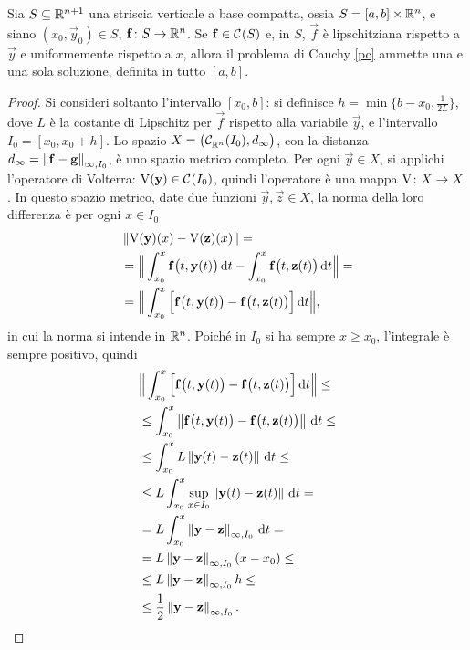 \begin{teorema} \label{t:E-globale}
	Sia $S\subseteq\mathbb{R}^{n+1}$ una striscia verticale a base compatta, ossia $S=[a,b]\times\mathbb{R}^n$, e siano $(x_0,\vec y_0)\in S$, $\mathbf{f}\colon S\to\mathbb{R}^n$. Se $\mathbf{f}\in\mathcal{C}^{{}}(S)$ e, in $S$, $\vec f$ è lipschitziana rispetto a $\vec y$ e uniformemente rispetto a $x$, allora il problema di Cauchy \eqref{pc} ammette una e una sola soluzione, definita in tutto $[a,b]$.
\end{teorema}
\begin{proof}
Si consideri soltanto l'intervallo $[x_0,b]$: si definisce $h=\min\{b-x_0,\frac1{2L}\}$, dove $L$ è la costante di Lipschitz per $\vec f$ rispetto alla variabile $\vec y$, e l'intervallo $I_0=[x_0,x_0+h]$. Lo spazio $X=\big(\mathcal{C}^{{}}_{\mathbb{R}^n}(I_0),d_\infty\big)$, con la distanza $d_{\infty}=\left\|{\mathbf{f}-\mathbf{g}}\right\|_{\infty,I_0}$, è uno spazio metrico completo. Per ogni $\vec y\in X$, si applichi l'operatore di Volterra: $\operatorname{V}(\mathbf{y})\in\mathcal{C}^{{}}(I_0)$, quindi l'operatore è una mappa $\operatorname{V}\colon X\to X$. In questo spazio metrico, date due funzioni $\vec y,\vec z\in X$, la norma della loro differenza è per ogni $x\in I_0$
\begin{align*}
&\left\|{\operatorname{V}(\mathbf{y})(x)-\operatorname{V}(\mathbf{z})(x)}\right\|=\\
&=\Big\|\int_{x_0}^x\mathbf{f}\big(t,\mathbf{y}(t)\big)\,\textup{d} t-\int_{x_0}^x\mathbf{f}\big(t,\mathbf{z}(t)\big)\,\textup{d} t\Big\|=\\
&=\Big\|\int_{x_0}^x\Big[\mathbf{f}\big(t,\mathbf{y}(t)\big)-\mathbf{f}\big(t,\mathbf{z}(t)\big)\Big]\,\textup{d} t\Big\|,
\end{align*}
in cui la norma si intende in $\mathbb{R}^n$. Poiché in $I_0$ si ha sempre $x\geq x_0$, l'integrale è sempre positivo, quindi
\begin{align*}
&\Big\|\int_{x_0}^x\Big[\vec f\big(t,\vec y(t)\big)-\vec f\big(t,\vec z(t)\big)\Big]\,\dd t\Big\|\leq\\
&\leq\int_{x_0}^x\norm{\vec f\big(t,\vec y(t)\big)-\vec f\big(t,\vec z(t)\big)}\,\dd t\leq\\
&\leq\int_{x_0}^xL\norm{\vec y(t)-\vec z(t)}\,\dd t\leq\\
&\leq L\int_{x_0}^x\sup_{x\in I_0}\norm{\vec y(t)-\vec z(t)}\,\dd t=\\
&=L\int_{x_0}^x\norm{\vec y-\vec z}_{\infty,I_0}\,\dd t=\\
&=L\norm{\vec y-\vec z}_{\infty,I_0}(x-x_0)\leq\\
&\leq L\norm{\vec y-\vec z}_{\infty,I_0}h\leq\\
&\leq\frac12\norm{\vec y-\vec z}_{\infty,I_0}.

\end{align*}
\end{proof}
